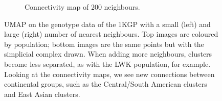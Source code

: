 \documentclass[12pt]{article}
\begin{document}
\begin{figure}[h!]
\begin{subfigure}[b]{0.49\linewidth}
    \caption{Connectivity map of 200 neighbours.}
    \label{fig:UMAP_high_NN_connectivity}
  \end{subfigure}
  \caption{UMAP on the genotype data of the 1KGP with a small (left) and large (right) number of nearest neighbours. Top images are coloured by population; bottom images are the same points but with the simplicial complex drawn. When adding more neighbours, clusters become less separated, as with the LWK population, for example. Looking at the connectivity maps, we see new connections between continental groups, such as the Central/South American clusters and East Asian clusters.}
  \label{fig:UMAP_connectivity}
\end{figure}

\newpage





\end{document}
